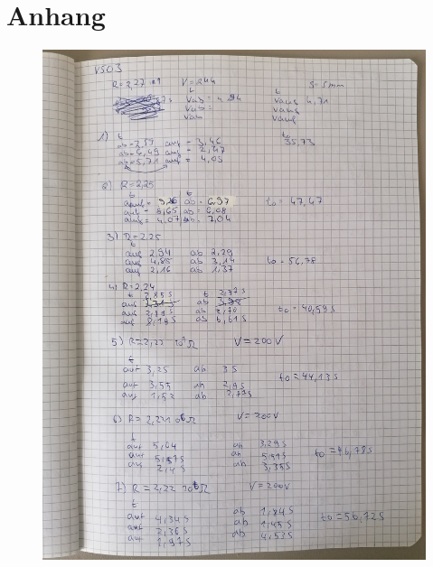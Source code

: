 \section{Anhang}

\begin{figure}
    \centering
    \includegraphics[width=\textwidth]{content/Anhang 1.jpg}
\end{figure}
    

